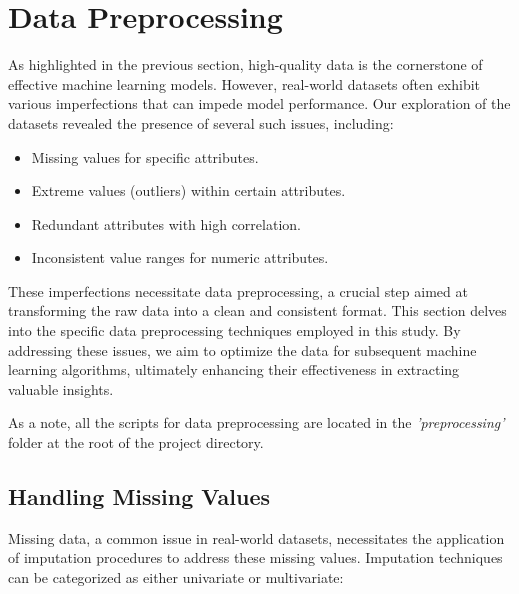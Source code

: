 \documentclass[runningheads]{paper}
\begin{document}
\section{Data Preprocessing}
As highlighted in the previous section, high-quality data is the cornerstone of 
effective machine learning models. However, real-world datasets often exhibit 
various imperfections that can impede model performance.  Our exploration of the 
datasets revealed the presence of several such issues, including:

\begin{itemize}
    \item Missing values for specific attributes.
    \item Extreme values (outliers) within certain attributes.
    \item Redundant attributes with high correlation.
    \item Inconsistent value ranges for numeric attributes.
\end{itemize}

These imperfections necessitate data preprocessing, a crucial step aimed at 
transforming the raw data into a clean and consistent format. This section 
delves into the specific data preprocessing techniques employed in this study. 
By addressing these issues, we aim to optimize the data for subsequent machine 
learning algorithms, ultimately enhancing their effectiveness in extracting 
valuable insights. 

As a note, all the scripts for data preprocessing are located in the \textit{'preprocessing'}
folder at the root of the project directory.

\subsection{Handling Missing Values}
Missing data, a common issue in real-world datasets, necessitates the application
of imputation procedures to address these missing values.  Imputation techniques 
can be categorized as either univariate or multivariate:
\end{document}
